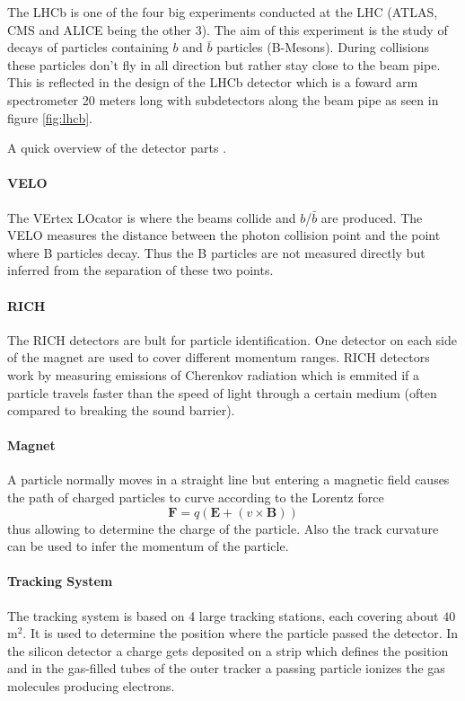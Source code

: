 \documentclass[11pt,twoside]{scrreprt}
\begin{document}
The LHCb is one of the four big experiments conducted at the LHC (ATLAS, CMS and ALICE being the other 3). The aim of this experiment is the study of decays of particles containing $b$ and $\bar{b}$ particles (B-Mesons). During collisions these particles don't fly in all direction but rather stay close to the beam pipe. This is reflected in the design of the LHCb detector which is a foward arm spectrometer 20 meters long with subdetectors along the beam pipe as seen in figure \ref{fig:lhcb}.

A quick overview of the detector parts \parencite{lhcbweb}.

\paragraph{VELO} The VErtex LOcator is where the beams collide and $b$/$\bar{b}$ are produced. The VELO measures the distance between the photon collision point and the point where B particles decay. Thus the B particles are not measured directly but inferred from the separation of these two points.

\paragraph{RICH} The RICH detectors are bult for particle identification. One detector on each side of the magnet are used to cover different momentum ranges. RICH detectors work by measuring emissions of Cherenkov radiation which is emmited if a particle travels faster than the speed of light through a certain medium (often compared to breaking the sound barrier).

\paragraph{Magnet} A particle normally moves in a straight line but entering a magnetic field causes the path of charged particles to curve according to the Lorentz force \[
  \mathbf{F} = q\left( \mathbf{E} + \left( v\times\mathbf{B}\right)\right)
\]
thus allowing to determine the charge of the particle. Also the track curvature can be used to infer the momentum of the particle.

\paragraph{Tracking System} The tracking system is based on 4 large tracking stations, each covering about $40$\,m$^2$. It is used to determine the position where the particle passed the detector. In the silicon detector a charge gets deposited on a strip which defines the position and in the gas-filled tubes of the outer tracker a passing particle ionizes the gas molecules producing electrons.
\end{document}
